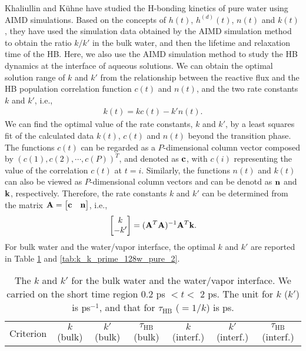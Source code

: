 {Khaliullin and K\"uhne have studied the H-bonding kinetics of pure water using AIMD simulations. \cite{Khaliullin2013}
Based on the concepts of $h(t)$, $h^{(d)}(t)$, $n(t)$ and $k(t)$, they have used the simulation data 
obtained by the AIMD simulation method to obtain the ratio $k/k'$ in the bulk water, and then the lifetime and relaxation time 
of the HB.  Here, we also use the AIMD simulation method to study the HB dynamics at the interface of aqueous 
solutions. We can obtain the optimal solution range of $k$ and $k'$ from the relationship 
between the reactive flux and the HB population correlation function $c(t)$ and $n(t)$, and the two rate constants $k$ and $k'$, i.e.,
\begin{eqnarray}
  k(t) = kc(t)-k'n(t).
\label{eq:fitting_k_rates}
\end{eqnarray}
%
We can find the optimal value of the rate constants, $k$ and $k'$, 
by a least squares fit of the calculated data $k(t)$, $c(t)$ and $n(t)$ beyond the transition phase.  
The functions $c(t)$ can be regarded as a $P$-dimensional column vector composed by $(c(1),c(2),\cdots,c(P))^T$, and denoted as ${\bf c}$,
with $c(i)$ representing the value of the correlation $c(t)$ at $t=i$.
Similarly, the functions $n(t)$ and $k(t)$ can also be viewed as $P$-dimensional column vectors and can be denotd as ${\bf n}$ and ${\bf k}$, respectively.
Therefore, the rate constants $k$ and $k'$ can be determined from the matrix ${\bf A} = \begin{bmatrix} {\bf c} & {\bf n} \end{bmatrix}$, i.e., 
\begin{equation}
\begin{bmatrix} k\\ -k' \end{bmatrix} = ({\bf A}^T {\bf A})^{-1} {\bf A}^T {\bf k}. 
\end{equation}
For bulk water and the water/vapor interface, the optimal $k$ and $k'$ are reported in Table 
\ref{tab:k_k_prime_128w_pure_1} and \ref{tab:k_k_prime_128w_pure_2}. 
% 
\begin{table}[htb]
\centering
\caption{\label{tab:k_k_prime_128w_pure_1} 
    The $k$ and $k'$ for the bulk water and the water/vapor interface. We carried on the short time region 0.2 ps $< t <$ 2 ps. 
The unit for $k$ ($k'$) is ps$^{-1}$, and that for $\tau_{\text{HB}}$ ($=1/k$) is ps.} 
\begin{tabular}{ccccccc}
 Criterion & $k$  (bulk) & $k'$ (bulk) & $\tau_{\text{HB}}$ (bulk) & $k$  (interf.) & $k'$ (interf.) & $\tau_{\text{HB}}$ (interf.)\\

\end{tabular}
\end{table}}
